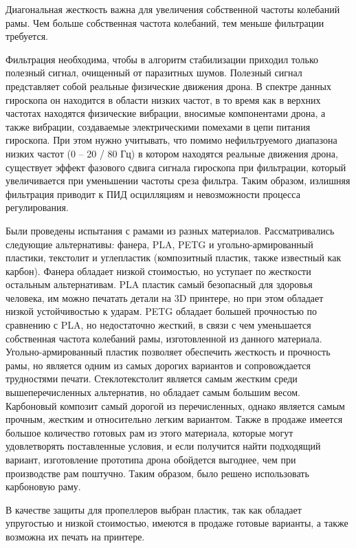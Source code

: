 Диагональная жесткость важна для увеличения собственной частоты колебаний рамы. Чем больше собственная частота колебаний, тем меньше фильтрации требуется.

Фильтрация необходима, чтобы в алгоритм стабилизации приходил только полезный сигнал, очищенный от паразитных шумов.
Полезный сигнал представляет собой реальные физические движения дрона. В спектре данных гироскопа он находится в области низких частот, в то время как в верхних частотах находятся физические вибрации, вносимые компонентами дрона, а также вибрации, создаваемые электрическими помехами в цепи питания гироскопа.
При этом нужно учитывать, что помимо нефильтруемого диапазона низких частот (0 -- 20 / 80 Гц) в котором находятся реальные движения дрона, существует эффект фазового сдвига сигнала гироскопа при фильтрации, который увеличивается при уменьшении частоты среза фильтра. Таким образом, излишняя фильтрация приводит к ПИД осцилляциям и невозможности процесса регулирования.

Были проведены испытания с рамами из разных материалов. Рассматривались следующие альтернативы: фанера, PLA, PETG и угольно-армиро\-ван\-ный пластики, текстолит и углепластик (композитный пластик, также известный как карбон). Фанера обладает низкой стоимостью, но уступает по жесткости остальным альтернативам. PLA пластик самый безопасный для здоровья человека, им можно печатать детали на 3D принтере, но при этом обладает низкой устойчивостью к ударам. PETG обладает большей прочностью по сравнению с PLA, но недостаточно жесткий, в связи с чем уменьшается собственная частота колебаний рамы, изготовленной из данного материала. Угольно-армированный пластик позволяет обеспечить жесткость и прочность рамы, но является одним из самых дорогих вариантов и сопровождается трудностями печати.
Стеклотекстолит является самым жестким среди вышеперечисленных альтернатив, но обладает самым большим весом. Карбоновый композит самый дорогой из перечисленных, однако является самым прочным, жестким и относительно легким вариантом. Также в продаже имеется большое количество готовых рам из этого материала, которые могут удовлетворять поставленные условия, и если получится найти подходящий вариант, изготовление прототипа дрона обойдется выгоднее, чем при производстве рам поштучно. Таким образом, было решено использовать карбоновую раму.

В качестве защиты для пропеллеров выбран пластик, так как обладает упругостью и низкой стоимостью, имеются в продаже готовые варианты, а также возможна их печать на принтере.

